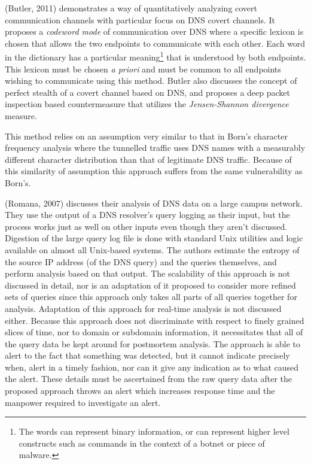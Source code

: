 \documentclass[12pt]{report}
\theoremstyle{remark}
\theoremstyle{definition}
\theoremstyle{definition}
\theoremstyle{definition}
\begin{document}
(Butler, 2011)\cite{Butler2011} demonstrates a way of quantitatively analyzing
covert communication channels with particular focus on DNS covert channels. It
proposes a \emph{codeword mode} of communication over DNS where a specific
lexicon is chosen that allows the two endpoints to communicate with each other.
Each word in the dictionary has a particular meaning\footnote{The words can
represent binary information, or can represent higher level constructs such as
commands in the context of a botnet or piece of malware.} that is understood by
both endpoints. This lexicon must be chosen \emph{a priori} and must be common
to all endpoints wishing to communicate using this method. Butler also discusses
the concept of perfect stealth of a covert channel based on DNS, and proposes a
deep packet inspection based countermeasure that utilizes the
\emph{Jensen-Shannon divergence} measure.

This method relies on an assumption very similar to that in Born's character
frequency analysis where the tunnelled traffic uses DNS names with a measurably
different character distribution than that of legitimate DNS traffic. Because of
this similarity of assumption this approach suffers from the same vulnerability
as Born's.

(Romana, 2007)\cite{Romana2007} discusses their analysis of DNS data on a large
campus network. They use the output of a DNS resolver's query logging as their
input, but the process works just as well on other inputs even though they
aren't discussed. Digestion of the large query log file is done with standard
Unix utilities and logic available on almost all Unix-based systems. The authors
estimate the entropy of the source IP address (of the DNS query) and the queries
themselves, and perform analysis based on that output. The scalability of this
approach is not discussed in detail, nor is an adaptation of it proposed to
consider more refined sets of queries since this approach only takes all parts
of all queries together for analysis. Adaptation of this approach for real-time
analysis is not discussed either. Because this approach does not discriminate
with respect to finely grained slices of time, nor to domain or subdomain
information, it necessitates that all of the query data be kept around for
postmortem analysis. The approach is able to alert to the fact that something
was detected, but it cannot indicate precisely when, alert in a timely
fashion, nor can it give any indication as to what caused the alert. These
details must be ascertained from the raw query data after the proposed approach
throws an alert which increases response time and the manpower required to
investigate an alert.
\end{document}
